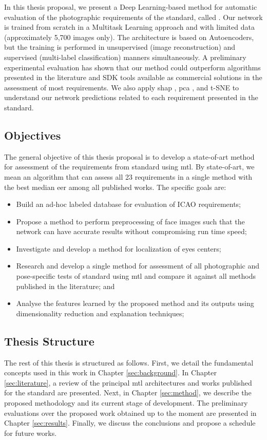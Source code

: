 In this thesis proposal, we present a Deep Learning-based method for automatic evaluation of the photographic requirements of the \icao standard, called \methodname. Our network is trained from scratch in a Multitask Learning approach and with limited data (approximately 5,700 images only). The architecture is based on Autoencoders, but the training is performed in unsupervised (image reconstruction) and supervised (multi-label classification) manners simultaneously. A preliminary experimental evaluation has shown that our method could outperform algorithms presented in the literature and SDK tools available as commercial solutions in the assessment of most requirements. We also apply \acf{shap} \citep{shap2018}, \acf{pca} \citep{pca}, and t-SNE \citep{tsne} to understand our network predictions related to each requirement presented in the \icao standard.

\subsection{Objectives}	

The general objective of this thesis proposal is to develop a state-of-art method for assessment of the requirements from \icao standard using \acl{mtl}. By state-of-art, we mean an algorithm that can assess all 23 requirements in a single method with the best median \acs{eer} among all published works. The specific goals are:

\begin{itemize}
\item Build an ad-hoc labeled database for evaluation of ICAO requirements;
\item Propose a method to perform preprocessing of face images such that the network can have accurate results without compromising run time speed;
\item Investigate and develop a method for localization of eyes centers;
\item Research and develop a single method for assessment of all photographic and pose-specific tests of \icao standard using \acf{mtl} and compare it against all methods published in the literature; and
\item Analyse the features learned by the proposed method and its outputs using dimensionality reduction and explanation techniques;
\end{itemize}

\subsection{Thesis Structure}

The rest of this thesis is structured as follows. First, we detail the fundamental concepts used in this work in Chapter \ref{sec:background}. In Chapter \ref{sec:literature}, a review of the principal \acl{mtl} architectures and works published for the \icao standard are presented. Next, in Chapter \ref{sec:method}, we describe the proposed methodology and its current stage of development. The preliminary evaluations over the proposed work obtained up to the moment are presented in Chapter \ref{sec:results}. Finally, we discuss the conclusions and propose a schedule for future works.
